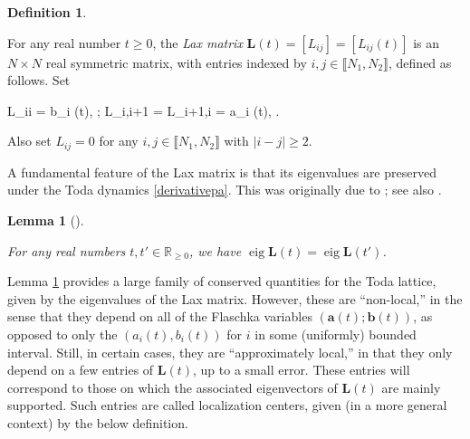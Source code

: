 \documentclass{amsart}
\numberwithin{equation}{section}
\DeclareMathOperator{\eig}{eig}
\newtheorem{lem}[thm]{Lemma}
\theoremstyle{remark}
\theoremstyle{definition}
\newtheorem{definition}[thm]{Definition}
\begin{document}
	\begin{definition}
		\label{matrixl} 
		
		For any real number $t \ge 0$, the \emph{Lax matrix} $\bm{L}(t) = [ L_{ij}] = [L_{ij}(t)]$ is an $N \times N$ real symmetric matrix, with entries indexed by $i, j \in \llbracket N_1, N_2 \rrbracket$, defined as follows. Set
		\begin{flalign*} 
			L_{ii} = b_i (t), \quad {}; \qquad L_{i,i+1} = L_{i+1,i} = a_i (t), \quad {}.
		\end{flalign*} 
		
		\noindent Also set $L_{ij} = 0$ for any $i,j \in \llbracket N_1, N_2 \rrbracket$ with $|i-j| \ge 2$. 
		
	\end{definition} 
	
	A fundamental feature of the Lax matrix is that its eigenvalues are preserved under the Toda dynamics \eqref{derivativepa}. This was originally due to \cite{LEI}; see also \cite[Section 2]{FMPL}.
	
	\begin{lem}[\cite{LEI,FMPL}]
		\label{ltt}
		
		For any real numbers $t, t' \in \mathbb{R}_{\ge 0}$, we have $\eig \bm{L} (t) = \eig \bm{L}(t')$. 
		
	\end{lem} 
	
	Lemma \ref{ltt} provides a large family of conserved quantities for the Toda lattice, given by the eigenvalues of the Lax matrix. However, these are ``non-local,'' in the sense that they depend on all of the Flaschka variables $(\bm{a}(t);\bm{b}(t))$, as opposed to only the $(a_i(t),b_i(t))$ for $i$ in some (uniformly) bounded interval. Still, in certain cases, they are ``approximately local,'' in that they only depend on a few entries of $\bm{L}(t)$, up to a small error. These entries will correspond to those on which the associated eigenvectors of $\bm{L}(t)$ are mainly supported. Such entries are called localization centers, given (in a more general context) by the below definition. 
	
\end{document}
